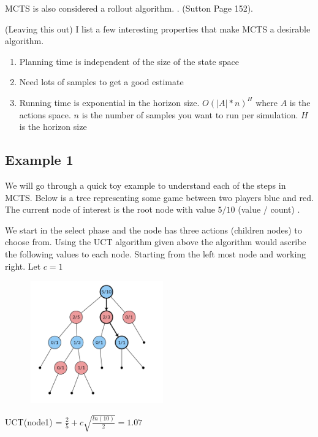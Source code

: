 \begin{search_page}
MCTS is also considered a rollout algorithm. .
(Sutton Page 152). 

(Leaving this out)
I list a few interesting properties that make MCTS a desirable algorithm.
\begin{enumerate}
    \item Planning time is independent of the size of the state space
    \item Need lots of samples to get a good estimate
    \item Running time is exponential in the horizon size. $O(|A|*n)^{H}$ where $A$ is the actions space. $n$ is the number of samples you want to run per simulation. $H$ is the horizon size
\end{enumerate}

\subsection{Example 1}

We will go through a quick toy example to understand each of the steps in MCTS. 
Below is a tree representing some game between two players blue and red. The current node of interest is the root node with value $ 5 / 10 $ (value / count) . 

We start in the select phase and the node has three actions (children nodes) to choose from. Using the UCT algorithm given above the algorithm would ascribe the following values to each node. Starting from the left most node and working right. Let $ c = 1 $

\includegraphics[width=300px,height=200px]{images/mcts_selection.png}

UCT(node1) = $ \frac{2}{5} + c \sqrt{\frac{ln({10})}{2}} = 1.07$


\end{search_page}
